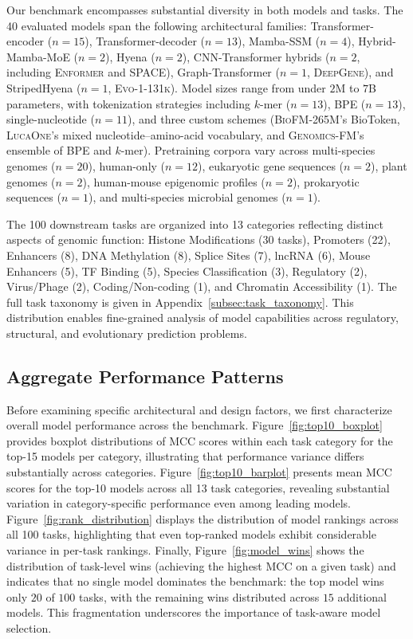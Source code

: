 \documentclass{article}
\theoremstyle{plain}
\theoremstyle{definition}
\theoremstyle{remark}
\begin{document}
Our benchmark encompasses substantial diversity in both models and
tasks. The 40 evaluated models span the following architectural
families: Transformer-encoder ($n=15$), Transformer-decoder ($n=13$),
Mamba-SSM ($n=4$), Hybrid-Mamba-MoE ($n=2$), Hyena ($n=2$),
CNN-Transformer hybrids ($n=2$, including \textsc{Enformer} and
\textsc{SPACE}), Graph-Transformer ($n=1$, \textsc{DeepGene}), and
StripedHyena ($n=1$, \textsc{Evo-1-131k}). Model sizes range from
under $2$M to $7$B parameters, with tokenization strategies including
$k$-mer ($n=13$), BPE ($n=13$), single-nucleotide ($n=11$), and three
custom schemes (\textsc{BioFM-265M}'s BioToken, \textsc{LucaOne}'s
mixed nucleotide--amino-acid vocabulary, and \textsc{Genomics-FM}'s
ensemble of BPE and $k$-mer). Pretraining corpora vary across
multi-species genomes ($n=20$), human-only ($n=12$), eukaryotic gene
sequences ($n=2$), plant genomes ($n=2$), human-mouse epigenomic
profiles ($n=2$), prokaryotic sequences ($n=1$), and multi-species
microbial genomes ($n=1$).

The 100 downstream tasks are organized into 13 categories reflecting
distinct aspects of genomic function: Histone Modifications (30 tasks),
Promoters (22), Enhancers (8), DNA Methylation (8), Splice Sites (7),
lncRNA (6), Mouse Enhancers (5), TF Binding (5), Species
Classification (3), Regulatory (2), Virus/Phage (2),
Coding/Non-coding (1), and Chromatin Accessibility (1). The full task
taxonomy is given in Appendix~\ref{subsec:task_taxonomy}. This
distribution enables fine-grained analysis of model capabilities
across regulatory, structural, and evolutionary prediction problems.

\subsection{Aggregate Performance Patterns}
\label{subsec:aggregate}

Before examining specific architectural and design factors, we first
characterize overall model performance across the benchmark.
Figure~\ref{fig:top10_boxplot} provides boxplot distributions of MCC
scores within each task category for the top-15 models per category,
illustrating that performance variance differs substantially across
categories. 
Figure~\ref{fig:top10_barplot} presents mean MCC scores for the top-10
models across all 13 task categories, revealing substantial variation
in category-specific performance even among leading models.
Figure~\ref{fig:rank_distribution} displays the distribution of model
rankings across all 100 tasks, highlighting that even top-ranked
models exhibit considerable variance in per-task rankings. 
Finally, Figure~\ref{fig:model_wins} shows the distribution of task-level wins
(achieving the highest MCC on a given task) and indicates that no
single model dominates the benchmark: the top model wins only $20$ of
$100$ tasks, with the remaining wins distributed across $15$ additional
models. This fragmentation underscores the importance of task-aware
model selection.
\end{document}
